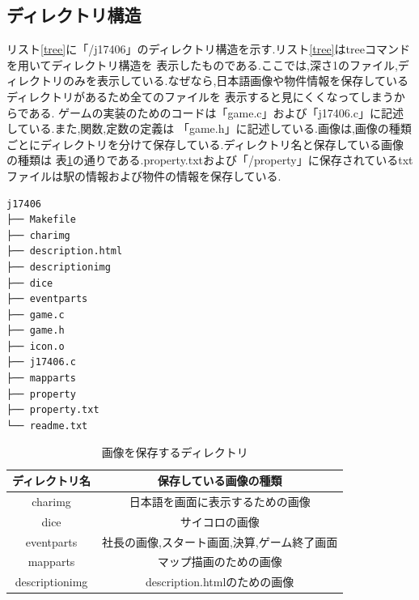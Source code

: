 \documentclass[a4j]{jarticle}
\begin{document}
      \subsection{ディレクトリ構造}
      リスト\ref{tree}に「/j17406」のディレクトリ構造を示す.リスト\ref{tree}はtreeコマンドを用いてディレクトリ構造を
      表示したものである.ここでは,深さ1のファイル,ディレクトリのみを表示している.なぜなら,日本語画像や物件情報を保存しているディレクトリがあるため全てのファイルを
      表示すると見にくくなってしまうからである.
      ゲームの実装のためのコードは「game.c」および「j17406.c」に記述している.また,関数,定数の定義は
      「game.h」に記述している.画像は,画像の種類ごとにディレクトリを分けて保存している.ディレクトリ名と保存している画像の種類は
      表\ref{imgdir}の通りである.property.txtおよび「/property」に保存されているtxtファイルは駅の情報および物件の情報を保存している.
    
        \begin{lstlisting}[basicstyle=\ttfamily\footnotesize, frame=single,label=tree,caption=ディレクトリ構造]
j17406
├── Makefile
├── charimg
├── description.html
├── descriptionimg
├── dice
├── eventparts
├── game.c
├── game.h
├── icon.o
├── j17406.c
├── mapparts
├── property
├── property.txt
└── readme.txt
        \end{lstlisting}    
        
      \begin{table}[H]
        \caption{画像を保存するディレクトリ}
      \label{imgdir}
      \begin{center}
          \begin{tabular}{c|c}\hline
            ディレクトリ名 & 保存している画像の種類 \\ \hline \hline
            charimg & 日本語を画面に表示するための画像 \\
            dice & サイコロの画像 \\ 
            eventparts & 社長の画像,スタート画面,決算,ゲーム終了画面 \\ 
            mapparts & マップ描画のための画像 \\
            descriptionimg & description.htmlのための画像 \\ \hline
          \end{tabular}
      \end{center}
      \end{table}
        
    
\end{document}
